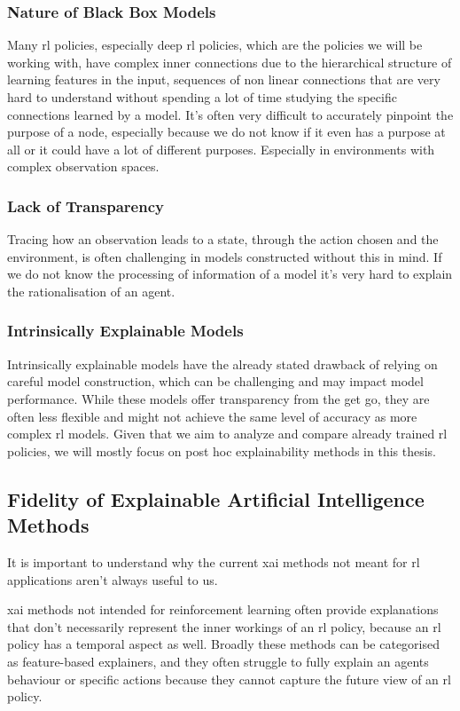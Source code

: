 \documentclass[UKenglish]{uiomasterthesis}
\begin{document}
\subsubsection{Nature of Black Box Models}
Many \ac{rl} policies, especially deep \ac{rl} policies, which are the policies we will be working with, have complex inner connections due to the hierarchical structure of learning features in the input, sequences of non linear connections that are very hard to understand without spending a lot of time studying the specific connections learned by a model. It's often very difficult to accurately pinpoint the purpose of a node, especially because we do not know if it even has a purpose at all or it could have a lot of different purposes. Especially in environments with complex observation spaces.


\subsubsection{Lack of Transparency}
Tracing how an observation leads to a state, through the action chosen and the environment, is often challenging in models constructed without this in mind. If we do not know the processing of information of a model it's very hard to explain the rationalisation of an agent.

\subsubsection{Intrinsically Explainable Models}
Intrinsically explainable models have the already stated drawback of relying on careful model construction, which can be challenging and may impact model performance. While these models offer transparency from the get go, they are often less flexible and might not achieve the same level of accuracy as more complex \ac{rl} models. Given that we aim to analyze and compare already trained \ac{rl} policies, we will mostly focus on post hoc explainability methods in this thesis.

\medskip

\subsection{Fidelity of Explainable Artificial Intelligence Methods}
It is important to understand why the current \ac{xai} methods not meant for \ac{rl} applications aren't always useful to us.

\ac{xai} methods not intended for reinforcement learning often provide explanations that don't necessarily represent the inner workings of an \ac{rl} policy, because an \ac{rl} policy has a temporal aspect as well. Broadly these methods can be categorised as feature-based explainers, and they often struggle to fully explain an agents behaviour or specific actions because they cannot capture the future view of an \ac{rl} policy. 
\end{document}
